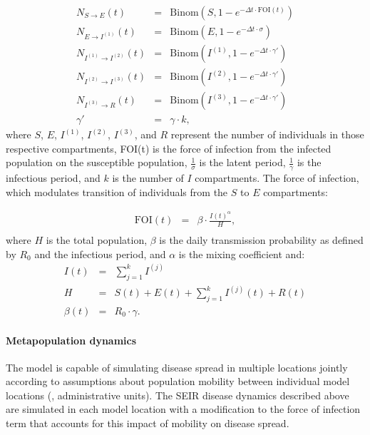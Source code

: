 {\begin{eqnarray}
N_{S \to E} (t) &=& \text{Binom}\left(S, 1 - e^{- \Delta t \cdot \text{FOI}(t)}\right) \\
N_{E \to I^{( 1)}} (t) &=& \text{Binom}\left(E, 1 - e^{- \Delta t \cdot \sigma} \right) \\
N_{I^{( 1 )} \to I^{( 2)}} (t) &=& \text{Binom}\left(I^{( 1)}, 1 - e^{- \Delta t \cdot \gamma'} \right) \\
N_{I^{(2)} \to I^{(3)}} (t) &=& \text{Binom}\left(I^{(2)}, 1 - e^{- \Delta t \cdot \gamma' } \right) \\
N_{I^{(3)} \to R} (t) &=& \text{Binom}\left(I^{(3)}, 1 - e^{- \Delta t \cdot \gamma' } \right) \\
\gamma' &=& \gamma \cdot k,
\end{eqnarray}
where $S$, $E$, $I^{\left(1\right)}$, $I^{\left(2\right)}$, $I^{\left(3\right)}$, and $R$ represent the number of individuals in those respective compartments, FOI(t) is the force of infection from the infected population on the susceptible population, $\frac{1}{\sigma}$ is the latent period, $\frac{1}{\gamma}$ is the infectious period, and $k$ is the number of $I$ compartments. The force of infection, which modulates transition of individuals from the $S$ to $E$ compartments:

\begin{eqnarray}
\text{FOI}(t) &=&\beta \cdot \frac{I{(t)}^{\alpha}}{H}, \\
\end{eqnarray}
where $H$ is the total population, $\beta$ is the daily transmission probability as defined by $R_0$ and the infectious period, and $\alpha$ is the mixing coefficient and:
\begin{eqnarray}
I(t) &=& \sum\limits_{{j = 1}}^{k} I^{( j)} \\
H &=& S(t)+E(t)+\sum_{j=1}^{k} I^{\left(j\right)}(t)+R(t) \\
\beta(t) &=& R_{0}\cdot\gamma.
\end{eqnarray}

\paragraph{Metapopulation dynamics}
The model is capable of simulating disease spread in multiple locations jointly according to assumptions about population mobility between individual model locations (\eg, administrative units). The SEIR disease dynamics described above are simulated in each model location with a modification to the force of infection term that accounts for this impact of mobility on disease spread.

}
